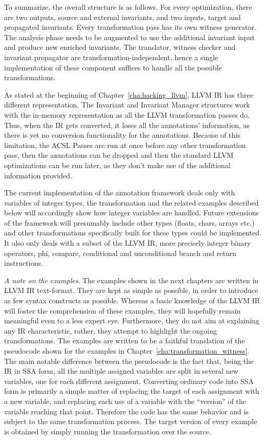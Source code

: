 To summarize, the overall structure is as follows. For every optimization, there are two outputs, source and external invariants, and two inputs, target and propagated invariants. Every transformation pass has its own witness generator. The analysis phase needs to be augmented to use the additional invariant input and produce new enriched invariants. The translator, witness checker and invariant propagator are transformation-independent, hence a single implementation of these component suffices to handle all the possible transformations.

As stated at the beginning of Chapter~\ref{cha:hacking_llvm}, LLVM IR has three different representation. The Invariant and Invariant Manager structures work with the in-memory representation as all the LLVM transformation passes do. Thus, when the IR gets converted, it loses all the annotations' information, as there is yet no conversion functionality for the annotations. Because of this limitation, the ACSL Passes are run at once before any other transformation pass, then the annotations can be dropped and then the standard LLVM optimizations can be run later, as they don't make use of the additional information provided.

The current implementation of the annotation framework deals only with variables of integer types, the transformation and the related examples described below will accordingly show how integer variables are handled. Future extensions of the framework will presumably include other types (floats, chars, arrays etc.) and other transformations specifically built for these types could be implemented. It also only deals with a subset of the LLVM IR, more precisely integer binary operators, phi, compare, conditional and unconditional branch and return instructions.

\emph{A note on the examples}. The examples shown in the next chapters are written in LLVM IR text-format. They are kept as simple as possible, in order to introduce as few syntax constructs as possible. Whereas a basic knowledge of the LLVM IR will foster the comprehension of these examples, they will hopefully remain meaningful even to a less expert eye. Furthermore, they do not aim at explaining any IR characteristic, rather, they attempt to highlight the ongoing transformations. The examples are written to be a faithful translation of the pseudocode shown for the examples in Chapter~\ref{cha:transformation_witness}. The main notable difference between the pseudocode is the fact that, being the IR in SSA form, all the multiple assigned variables are split in several new variables, one for each different assignment. Converting ordinary code into SSA form is primarily a simple matter of replacing the target of each assignment with a new variable, and replacing each use of a variable with the ``version'' of the variable reaching that point. Therefore the code has the same behavior and is subject to the same transformation process. The target version of every example is obtained by simply running the transformation over the source.

